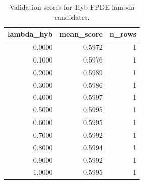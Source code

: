 \begin{table}[t]
\caption{Validation scores for Hyb-FPDE lambda candidates.}
\label{tab:lambda_distribution_computed}
\centering
\begin{tabular}{rrr}
\toprule
lambda\_hyb & mean\_score & n\_rows \\
\midrule
0.0000 & 0.5972 & 1 \\
0.1000 & 0.5976 & 1 \\
0.2000 & 0.5989 & 1 \\
0.3000 & 0.5986 & 1 \\
0.4000 & 0.5997 & 1 \\
0.5000 & 0.5995 & 1 \\
0.6000 & 0.5995 & 1 \\
0.7000 & 0.5992 & 1 \\
0.8000 & 0.5994 & 1 \\
0.9000 & 0.5992 & 1 \\
1.0000 & 0.5995 & 1 \\
\bottomrule
\end{tabular}

\end{table}
